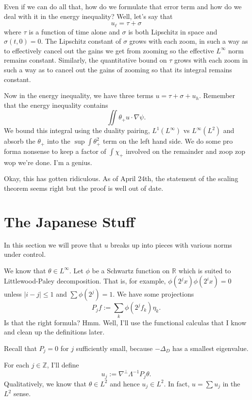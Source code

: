 \documentclass[11pt]{amsart}
\theoremstyle{remark}
\newcommand{\R}{\mathbb{R}}
\newcommand{\Z}{\mathbb{Z}}
\newcommand{\grad}{\nabla}
\newcommand{\Laplace}{\Delta}
\newcommand{\eigen}[1]{\eta_{#1}} %
\begin{document}
Even if we can do all that, how do we formulate that error term and how do we deal with it in the energy inequality?  Well, let's say that
\[ u_\ell = \tau + \sigma \]
where $\tau$ is a function of time alone and $\sigma$ is both Lipschitz in space and $\sigma(t,0) = 0$.  The Lipschitz constant of $\sigma$ grows with each zoom, in such a way as to effectively cancel out the gains we get from zooming so the effective $L^\infty$ norm remains constant.  Similarly, the quantitative bound on $\tau$ grows with each zoom in such a way as to cancel out the gains of zooming so that its integral remains constant.  

Now in the energy inequality, we have three terms $u = \tau + \sigma + u_h$.  Remember that the energy inequality contains
\[ \iint \theta_+ u \cdot \grad \psi. \]
We bound this integral using the duality pairing, $L^1(L^\infty)$ vs $L^\infty(L^2)$ and absorb the $\theta_+$ into the $\sup \int \theta_+^2$ term on the left hand side.  We do some pro forma nonsense to keep a factor of $\int \chi_+$ involved on the remainder and zoop zop wop we're done.  I'm a genius.  

Okay, this has gotten ridiculous.  As of April 24th, the statement of the scaling theorem seems right but the proof is well out of date.  




\section{The Japanese Stuff}

In this section we will prove that $u$ breaks up into pieces with various norms under control.  

We know that $\theta \in L^\infty$.  Let $\phi$ be a Schwartz function on $\R$ which is suited to Littlewood-Paley decomposition.  That is, for example, $\phi(2^j x) \phi(2^i x) = 0$ unless $|i-j|\leq 1$ and $\sum \phi(2^j) = 1$.  We have some projections 
\[ P_j f := \sum_k \phi(2^j f_k) \eigen{k}. \]
Is that the right formula?  Hmm.  Well, I'll use the functional calculas that I know and clean up the definitions later.  

Recall that $P_j = 0$ for $j$ sufficiently small, because $-\Laplace_D$ has a smallest eigenvalue.  

For each $j \in \Z$, I'll define
\[ u_j := \grad^\perp \Lambda^{-1} P_j \theta. \]
Qualitatively, we know that $\theta \in L^2$ and hence $u_j \in L^2$.  In fact, $u = \sum u_j$ in the $L^2$ sense.  
\end{document}
